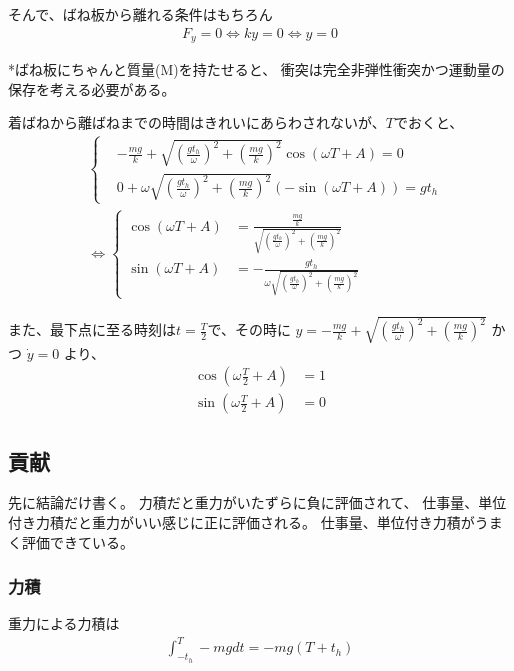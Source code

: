 \documentclass[a4paper,11pt]{jsarticle}
\begin{document}
そんで、ばね板から離れる条件はもちろん
\begin{align}
  F_y = 0 \Leftrightarrow ky = 0 \Leftrightarrow y = 0
\end{align}

*ばね板にちゃんと質量(M)を持たせると、
衝突は完全非弾性衝突かつ運動量の保存を考える必要がある。

着ばねから離ばねまでの時間はきれいにあらわされないが、$T$でおくと、
\begin{align}
   & \begin{cases}
        & -\frac{mg}{k} + \sqrt{\left(\frac{gt_h}{\omega}\right)^2 + \left(\frac{mg}{k}\right)^2} \cos \left( \omega T + A \right) = 0
       \\& 0 + \omega \sqrt{\left(\frac{gt_h}{\omega}\right)^2 + \left(\frac{mg}{k}\right)^2} \left( - \sin \left( \omega T + A \right) \right) = gt_h
     \end{cases}
  \\& \Leftrightarrow
  \begin{cases}
    \cos \left( \omega T + A \right) & = \frac{ \frac{mg}{k} }{ \sqrt{\left(\frac{gt_h}{\omega}\right)^2 + \left(\frac{mg}{k}\right)^2} }
    \\ \sin \left( \omega T + A \right) &= - \frac{gt_h}{ \omega \sqrt{\left(\frac{gt_h}{\omega}\right)^2 + \left(\frac{mg}{k}\right)^2} }
  \end{cases}
\end{align}

また、最下点に至る時刻は$t=\frac{T}{2}$で、その時に
$y=-\frac{mg}{k} + \sqrt{\left(\frac{gt_h}{\omega}\right)^2 + \left(\frac{mg}{k}\right)^2}$
かつ
$\dot{y} = 0$
より、
\begin{align}
  \cos \left( \omega \frac{T}{2} + A \right) & = 1
  \\
  \sin \left( \omega \frac{T}{2} + A \right) & = 0
\end{align}

\subsection{貢献}
先に結論だけ書く。
力積だと重力がいたずらに負に評価されて、
仕事量、単位付き力積だと重力がいい感じに正に評価される。
仕事量、単位付き力積がうまく評価できている。
\subsubsection{力積}
重力による力積は
\begin{align}
  \int_{-t_h}^{T} -mg dt = -mg \left(T + t_h\right)
\end{align}
\end{document}
